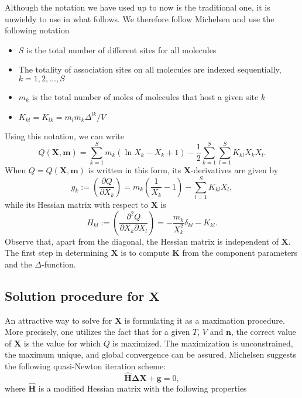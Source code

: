 \documentclass[english]{../thermomemo/thermomemo}
\newcommand{\mbf}[0]{\mathbf}
\newcommand*{\pder}[2]{\left(\frac{\partial #1}{\partial #2}\right)}
\newcommand*{\pdcross}[3]{\left(\frac{\partial^2 #1}{\partial #2 \partial #3}\right)}
\newcommand{\lp}{\left(}
\newcommand{\rp}{\right)}
\begin{document}
Although the notation we have used up to now is the traditional one, it is unwieldy to use in what follows. We therefore follow Michelsen \cite{Michelsen06} and use the following notation
\begin{itemize}
\item $S$ is the total number of different sites for all molecules
\item The totality of association sites on all molecules are indexed sequentially, $k=1,2,\ldots,S$
\item $m_k$ is the total number of moles of molecules that host a given site $k$
\item $K_{kl} = K_{lk} = m_l m_k \Delta^{lk}/V$
\end{itemize}
Using this notation, we can write
\begin{equation}
  Q(\mbf X, \mbf m) = \sum_{k=1}^S m_k(\ln X_k - X_k + 1) - \frac{1}{2} \sum_{k=1}^S \sum_{l=1}^S K_{kl} X_k X_l.
\end{equation}
When $Q = Q(\mbf X,\mbf m)$ is written in this form, its $\mbf X$-derivatives are given by
\begin{equation}
  \label{gDef}
  g_k := \pder{Q}{X_k} = m_k\lp \frac{1}{X_k} - 1 \rp - \sum_{l=1}^S K_{kl} X_l,
\end{equation}
while its Hessian matrix with respect to $\mbf X$ is
\begin{equation}
  \label{hDef}
  H_{kl} := \pdcross{Q}{X_k}{X_l} = - \frac{m_k}{X_k^2} \delta_{kl} - K_{kl}.
\end{equation}
Observe that, apart from the diagonal, the Hessian matrix is independent of $\mbf X$. The first step in determining $\mbf X$ is to compute $\mbf K$ from the component parameters and the $\Delta$-function.

\subsection{Solution procedure for $\mbf X$}
An attractive way to solve for $\mbf X$ is formulating it as a maximation procedure. More precisely, one utilizes the fact that for a given $T$, $V$ and $\mbf n$, the correct value of $\mbf X$ is the value for which $Q$ is maximized. The maximization is unconstrained, the maximum unique, and global convergence can be assured. Michelsen \cite{Michelsen06} suggests the following quasi-Newton iteration scheme:
\begin{equation}
  \label{quasiNewtonIteration}
  \mbf{\hat H \Delta X} + \mbf g = 0,
\end{equation}
where $\mbf{\hat H}$ is a modified Hessian matrix with the following properties
\end{document}
